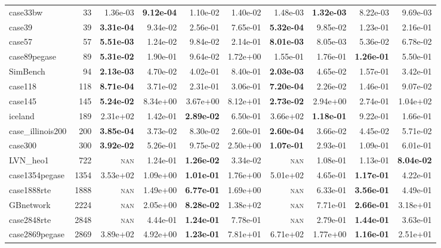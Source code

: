 \documentclass[10pt]{article}
\begin{document}
\begin{table}[H]
\begin{tabular}{lr rrrr rrrr}
case33bw & 33 & 1.36e-03 & \textbf{9.12e-04} & 1.10e-02 & 1.40e-02 & 1.48e-03 & \textbf{1.32e-03} & 8.22e-03 & 9.69e-03 \\
case39 & 39 & \textbf{3.31e-04} & 9.34e-02 & 2.56e-01 & 7.65e-01 & \textbf{5.32e-04} & 9.85e-02 & 1.23e-01 & 2.16e-01 \\
case57 & 57 & \textbf{5.51e-03} & 1.24e-02 & 9.84e-02 & 2.14e-01 & \textbf{8.01e-03} & 8.05e-03 & 5.36e-02 & 6.78e-02 \\
case89pegase & 89 & \textbf{5.31e-02} & 1.90e-01 & 9.64e-02 & 1.72e+00 & 1.55e-01 & 1.76e-01 & \textbf{1.26e-01} & 5.50e-01 \\
SimBench & 94 & \textbf{2.13e-03} & 4.70e-02 & 4.02e-01 & 8.40e-01 & \textbf{2.03e-03} & 4.65e-02 & 1.57e-01 & 3.42e-01 \\
case118 & 118 & \textbf{8.71e-04} & 3.71e-02 & 2.31e-01 & 3.06e-01 & \textbf{7.20e-04} & 2.26e-02 & 1.46e-01 & 9.07e-02 \\
case145 & 145 & \textbf{5.24e-02} & 8.34e+00 & 3.67e+00 & 8.12e+01 & \textbf{2.73e-02} & 2.94e+00 & 2.74e-01 & 1.04e+02 \\
iceland & 189 & 2.31e+02 & 1.42e-01 & \textbf{2.89e-02} & 6.50e-01 & 3.66e+02 & \textbf{1.18e-01} & 9.22e-01 & 1.66e-01 \\
case\_illinois200 & 200 & \textbf{3.85e-04} & 3.73e-02 & 8.30e-02 & 2.60e-01 & \textbf{2.60e-04} & 3.66e-02 & 4.45e-02 & 5.71e-02 \\
case300 & 300 & \textbf{3.92e-02} & 5.26e-01 & 9.75e-02 & 2.50e+00 & \textbf{1.07e-01} & 2.93e-01 & 1.09e-01 & 6.01e-01 \\
LVN\_heo1 & 722 & \textsc{nan} & 1.24e-01 & \textbf{1.26e-02} & 3.34e-02 & \textsc{nan} & 1.08e-01 & 1.13e-01 & \textbf{8.04e-02} \\
case1354pegase & 1354 & 3.53e+02 & 1.09e+00 & \textbf{1.01e-01} & 1.76e+00 & 5.01e+02 & 4.65e-01 & \textbf{1.17e-01} & 4.22e-01 \\
case1888rte & 1888 & \textsc{nan} & 1.49e+00 & \textbf{6.77e-01} & 1.69e+00 & \textsc{nan} & 6.33e-01 & \textbf{3.56e-01} & 4.49e-01 \\
GBnetwork & 2224 & \textsc{nan} & 2.05e+00 & \textbf{8.28e-02} & 1.38e+02 & \textsc{nan} & 7.71e-01 & \textbf{2.66e-01} & 3.18e+01 \\
case2848rte & 2848 & \textsc{nan} & 4.44e-01 & \textbf{1.24e-01} & 7.78e-01 & \textsc{nan} & 2.79e-01 & \textbf{1.44e-01} & 3.63e-01 \\
case2869pegase & 2869 & 3.89e+02 & 4.92e+00 & \textbf{1.23e-01} & 7.81e+01 & 6.71e+02 & 1.77e+00 & \textbf{1.16e-01} & 2.51e+01 \\

\end{tabular}
\end{table}
\end{document}
